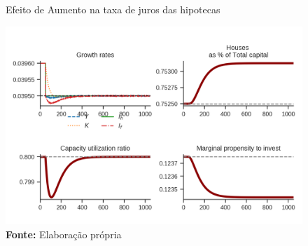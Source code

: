 \begin{figure}[H]
	\centering
	\caption{Efeito de Aumento na taxa de juros das hipotecas}
	\label{choque_3}
	\includegraphics{../../Modelo/Versoes/Shock_3.png}
	\caption*{\textbf{Fonte:} Elaboração própria}
\end{figure}



